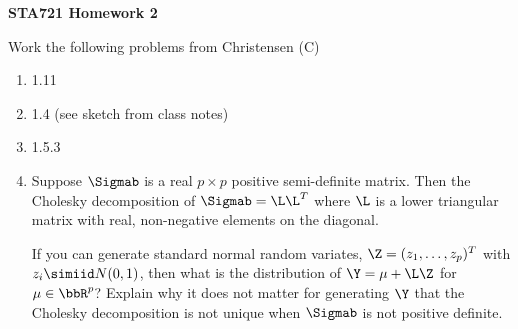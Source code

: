 \documentclass[12pt]{article}
\begin{document}
{\bf STA721 \hfill Homework 2}

\vspace{.5in}
\noindent
Work the following problems from Christensen (C)
\begin{enumerate}
\item 1.11
\item 1.4  (see sketch from class notes)
\item 1.5.3
\item Suppose $\Sigmab$ is a real $p \times p$ positive semi-definite
  matrix.  Then the Cholesky decomposition of 
  $\Sigmab = \L \L^T$ where $\L$ is a lower triangular matrix with
  real, non-negative elements on the diagonal.

  If you can generate standard normal random variates, $\Z = (z_1,
  \ldots, z_p)^T$ with $z_i \simiid N(0,1)$, then what is the
  distribution of $\Y = \mu + \L \Z$ for $\mu \in \bbR^p$?   Explain why it
  does not matter for generating $\Y$ that the Cholesky decomposition is
  not unique when $\Sigmab$ is not positive definite.

\end{enumerate}
\end{document}

